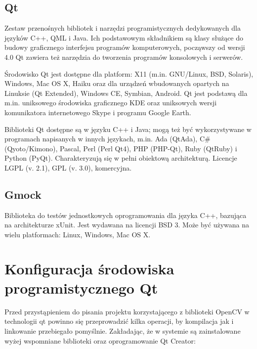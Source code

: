 \documentclass[eng,printmode]{mgr}
\begin{document}
\subsection{Qt}

Zestaw przenośnych bibliotek i narzędzi programistycznych dedykowanych dla języków C++, QML i Java. Ich podstawowym składnikiem są klasy służące do budowy graficznego interfejsu programów komputerowych, począwszy od wersji 4.0 Qt zawiera też narzędzia do tworzenia programów konsolowych i serwerów.

Środowisko Qt jest dostępne dla platform: X11 (m.in. GNU/Linux, BSD, Solaris), Windows, Mac OS X, Haiku oraz dla urządzeń wbudowanych opartych na Linuksie (Qt Extended), Windows CE, Symbian, Android. Qt jest podstawą dla m.in. uniksowego środowiska graficznego KDE oraz uniksowych wersji komunikatora internetowego Skype i programu Google Earth.

Biblioteki Qt dostępne są w języku C++ i Java; mogą też być wykorzystywane w programach napisanych w innych językach, m.in. Ada (QtAda), C\# (Qyoto/Kimono), Pascal, Perl (Perl Qt4), PHP (PHP-Qt), Ruby (QtRuby) i Python (PyQt). Charakteryzują się w pełni obiektową architekturą.
Licencje LGPL (v. 2.1), GPL (v. 3.0), komercyjna.\cite{wikiqt}
\subsection{Gmock}

Biblioteka do testów jednostkowych oprogramowania dla języka C++, bazująca na architekturze xUnit. Jest wydawana na licencji BSD 3. Może być używana na wielu platformach: Linux, Windows, Mac OS X.

\section{Konfiguracja środowiska programistycznego Qt}

Przed przystąpieniem do pisania projektu korzystającego z biblioteki OpenCV w technologii qt powinno się przeprowadzić kilka operacji, by kompilacja jak i linkowanie przebiegało pomyślnie. Zakładając, że w systemie są zainstalowane wyżej wspomniane biblioteki oraz oprogramowanie Qt Creator:
\end{document}
